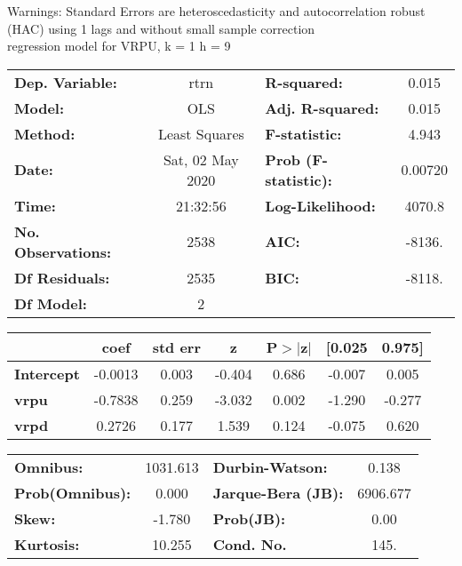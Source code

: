 Warnings: \newline
 [1] Standard Errors are heteroscedasticity and autocorrelation robust (HAC) using 1 lags and without small sample correction\\ 

regression model for VRPU, k = 1 h = 9\begin{center}
\begin{tabular}{lclc}
\toprule
\textbf{Dep. Variable:}    &       rtrn       & \textbf{  R-squared:         } &     0.015   \\
\textbf{Model:}            &       OLS        & \textbf{  Adj. R-squared:    } &     0.015   \\
\textbf{Method:}           &  Least Squares   & \textbf{  F-statistic:       } &     4.943   \\
\textbf{Date:}             & Sat, 02 May 2020 & \textbf{  Prob (F-statistic):} &  0.00720    \\
\textbf{Time:}             &     21:32:56     & \textbf{  Log-Likelihood:    } &    4070.8   \\
\textbf{No. Observations:} &        2538      & \textbf{  AIC:               } &    -8136.   \\
\textbf{Df Residuals:}     &        2535      & \textbf{  BIC:               } &    -8118.   \\
\textbf{Df Model:}         &           2      & \textbf{                     } &             \\
\bottomrule
\end{tabular}
\begin{tabular}{lcccccc}
                   & \textbf{coef} & \textbf{std err} & \textbf{z} & \textbf{P$> |$z$|$} & \textbf{[0.025} & \textbf{0.975]}  \\
\midrule
\textbf{Intercept} &      -0.0013  &        0.003     &    -0.404  &         0.686        &       -0.007    &        0.005     \\
\textbf{vrpu}      &      -0.7838  &        0.259     &    -3.032  &         0.002        &       -1.290    &       -0.277     \\
\textbf{vrpd}      &       0.2726  &        0.177     &     1.539  &         0.124        &       -0.075    &        0.620     \\
\bottomrule
\end{tabular}
\begin{tabular}{lclc}
\textbf{Omnibus:}       & 1031.613 & \textbf{  Durbin-Watson:     } &    0.138  \\
\textbf{Prob(Omnibus):} &   0.000  & \textbf{  Jarque-Bera (JB):  } & 6906.677  \\
\textbf{Skew:}          &  -1.780  & \textbf{  Prob(JB):          } &     0.00  \\
\textbf{Kurtosis:}      &  10.255  & \textbf{  Cond. No.          } &     145.  \\
\bottomrule
\end{tabular}
\end{center}

